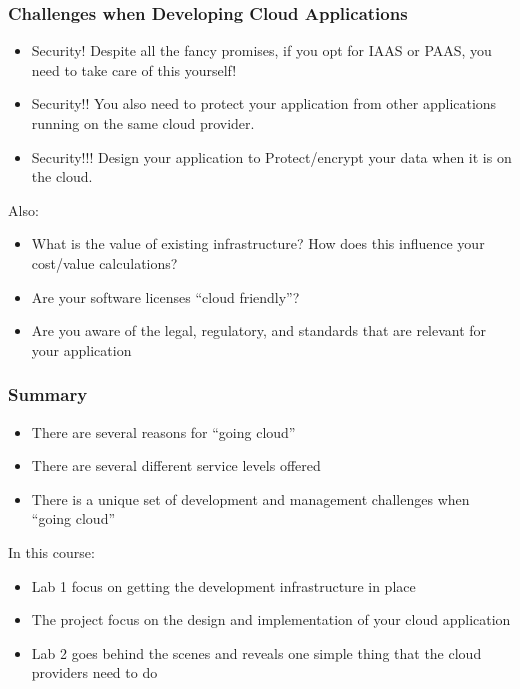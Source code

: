 \documentclass[10pt]{beamer}
\begin{document}
\begin{frame}[t]
\frametitle{Challenges when Developing Cloud Applications}

\begin{itemize}
\item Security! Despite all the fancy promises, if you opt for IAAS or PAAS, you need to take care of this yourself!
\item Security!! You also need to protect your application from other applications running on the same cloud provider.
\item Security!!! Design your application to Protect/encrypt your data when it is on the cloud.
\end{itemize}

Also:
\begin{itemize}
\item What is the value of existing infrastructure? How does this influence your cost/value calculations?
\item Are your software licenses ``cloud friendly''?
\item Are you aware of the legal, regulatory, and standards that are relevant for your application
\end{itemize}
\end{frame}


\begin{frame}[t]
\frametitle{Summary}
\begin{itemize}
\item There are several reasons for ``going cloud''
\item There are several different service levels offered
\item There is a unique set of development and management challenges when ``going cloud''
\end{itemize}

In this course:
\begin{itemize}
\item Lab 1 focus on getting the development infrastructure in place
\item The project focus on the design and implementation of your cloud application
\item Lab 2 goes behind the scenes and reveals one simple thing that the cloud providers need to do
\end{itemize}

\end{frame}


\end{document}
